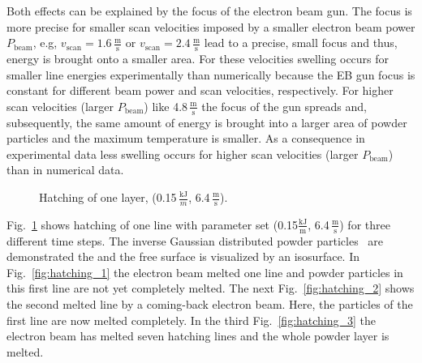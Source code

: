 Both effects can be explained by the focus of the electron beam gun. The focus is more precise for smaller scan velocities imposed by a smaller electron beam power $P_{\text{beam}}$, e.g, 
$v_{\text{scan}}=1.6\,\frac{\text{m}}{\text{s}}$ or $v_{\text{scan}}=2.4\,\frac{\text{m}}{\text{s}}$ lead to a precise, small focus and thus, energy is brought onto a smaller area. 
For these velocities swelling occurs for smaller line energies experimentally than numerically because the EB gun focus is constant for different beam power and scan velocities, respectively. 
For higher scan velocities (larger $P_{\text{beam}}$) 
like 4.8\,$\frac{\text{m}}{\text{s}}$ the focus of the gun spreads and, subsequently, the same amount of energy is brought into a larger area of powder particles and the maximum 
temperature is smaller. As a consequence in experimental data less swelling occurs for higher scan velocities (larger $P_{\text{beam}}$) than in numerical data. 


\begin{figure}[htpb]
\vspace{-15pt}
\centering
   \hspace{2ex}
   \hspace{2ex}
  \hspace{2ex}
 \vspace{-13pt}
\caption{Hatching of one layer, (0.15$\,\frac{\text{kJ}}{m}$, 6.4\,$\frac{\text{m}}{\text{s}}$).}
\label{fig:Hatching}
\vspace{-15pt}
\end{figure}
Fig.~\ref{fig:Hatching} shows hatching of one line with parameter set (0.15$\frac{\text{kJ}}{\text{m}}$, 6.4\,$\frac{\text{m}}{\text{s}}$) for three 
different time steps. The inverse Gaussian distributed powder particles~\cite{Ammer2013} are demonstrated the  and the free surface is visualized by an isosurface. 
In Fig.~\ref{fig:hatching_1} the electron beam melted one line and powder particles in this first line are not yet completely melted. 
The next Fig.~\ref{fig:hatching_2} shows the second melted line by a coming-back 
electron beam. Here, the particles of the first line are now melted completely. In the third Fig.~\ref{fig:hatching_3} the electron beam has melted 
seven hatching lines and the whole powder layer is melted. 
%